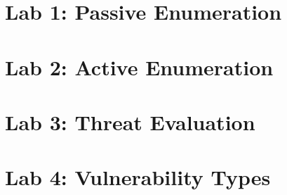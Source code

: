 \documentclass[oneside,openright,titlepage,numbers=noenddot,headinclude,footinclude=true,cleardoublepage=empty,listof=totoc,paper=a4,fontsize=11pt,english,BCOR=5mm]{scrreprt}
\begin{document}
  \frenchspacing
  \raggedbottom{}

  \pagestyle{plain}

  \singlespacing{}
  

  \onehalfspacing{}
  

  \cleardoublepage{}
  \pagestyle{scrheadings}
  \onehalfspacing{}
  \chapter{Lab 1: Passive Enumeration}\label{c:Lab-1}
  

  \chapter{Lab 2: Active Enumeration}\label{c:Lab-2}
  

  \chapter{Lab 3: Threat Evaluation}\label{c:Lab-3}
  

  \chapter{Lab 4: Vulnerability Types}\label{c:Lab-4}
  






  \cleardoublepage{}
  \appendix

  \singlespacing{}
  
  \cleardoublepage{}
\end{document}

